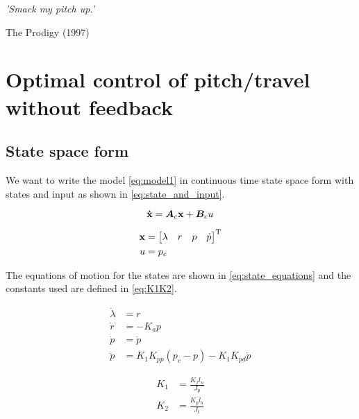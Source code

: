 \epigraph{\textit{'Smack my pitch up.'}}{The Prodigy (1997)}

\section{Optimal control of pitch/travel without feedback}



\subsection{State space form}
We want to write the model \eqref{eq:model1} in continuous time state space form with states and input as shown in \eqref{eq:state_and_input}.

\begin{equation}\label{eq:model1}
	\mathbf{\dot{x}} = \bm{A}_{c}\mathbf{x} + \bm{B}_{c}u
\end{equation}

\begin{subequations}\label{eq:state_and_input}
\begin{align}
	\mathbf{x} 	&= \begin{bmatrix}\lambda & r & p & \dot{p} \end{bmatrix}^{\text{T}} \\
	u 		&= p_{c}
\end{align}
\end{subequations}

The equations of motion for the states are shown in \eqref{eq:state_equations} and the constants used are defined in \eqref{eq:K1K2}.

\begin{subequations}\label{eq:state_equations}
\begin{align}
	\dot{\lambda} 	&= r \\
	\dot{r} 		&= - K_{a} p \\
	\dot{p} 		&= \dot{p} \\
	\ddot{p} 		&= K_{1} K_{pp} (p_{c} - p) - K_{1} K_{pd} \dot{p}
\end{align}
\end{subequations}

\begin{subequations}\label{eq:K1K2}
\begin{align}
	K_{1} &= \frac{K_{f} l_{n}}{J_{p}} \\
	K_{2} &= \frac{K_{p} l_{a}}{J_{t}}
\end{align}
\end{subequations}

